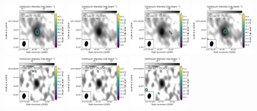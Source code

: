 \begin{figure}[htbp!]
  \centering
  \includegraphics[width=0.24\textwidth]{./moment0/Set1_ID07_CH3OH_243915.pdf}
  \includegraphics[width=0.24\textwidth]{./moment0/Set1_ID07_CH3OCHO_259342.pdf}
  \includegraphics[width=0.24\textwidth]{./moment0/Set1_ID07_CH3OCH3_259311.pdf}
  \includegraphics[width=0.24\textwidth]{./moment0/Set1_ID07_CH3CN_257527.pdf}
  \\
  \includegraphics[width=0.24\textwidth]{./moment0/Set1_ID08_CH3OH_243915.pdf}
  \includegraphics[width=0.24\textwidth]{./moment0/Set1_ID08_CH3OCHO_259342.pdf}
  \includegraphics[width=0.24\textwidth]{./moment0/Set1_ID08_CH3OCH3_259311.pdf}

\end{figure}

